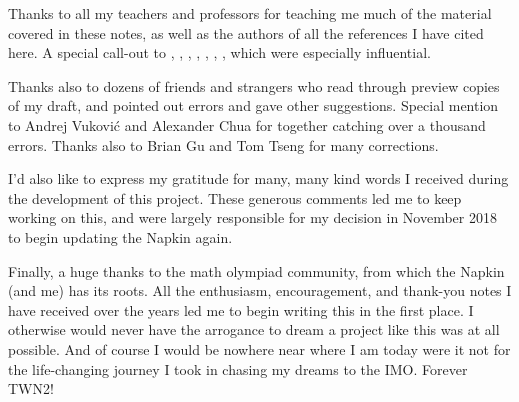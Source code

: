 \begin{itemize}
\ii Thanks to all my teachers and professors for teaching me much of the
material covered in these notes,
as well as the authors of all the references I have cited here.
A special call-out to \cite{ref:55a}, \cite{ref:msci},
\cite{ref:manifolds}, \cite{ref:gathmann}, \cite{ref:18-435},
\cite{ref:etingof}, \cite{ref:145a}, which were especially influential.

\ii Thanks also to dozens of friends and strangers
who read through preview copies of my draft,
and pointed out errors and gave other suggestions.
Special mention to Andrej Vukovi\'c and Alexander Chua
for together catching over a thousand errors.
Thanks also to Brian Gu and Tom Tseng for many corrections.

\ii I'd also like to express my gratitude for
many, many kind words I received
during the development of this project.
These generous comments led me to keep working on this,
and were largely responsible for my decision in November 2018
to begin updating the Napkin again.
\end{itemize}

Finally, a huge thanks to the math olympiad community,
from which the Napkin (and me) has its roots.
All the enthusiasm, encouragement, and thank-you notes I have received
over the years led me to begin writing this in the first place.
I otherwise would never have the arrogance to dream a project like this
was at all possible.
And of course I would be nowhere near where I am today were it not for the
life-changing journey I took in chasing my dreams to the IMO.
Forever TWN2!

